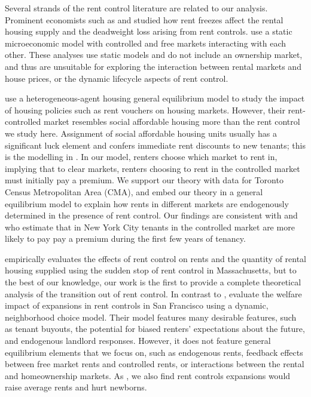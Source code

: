 \documentclass[parskip=full]{article}
\begin{document}
Several strands of the rent control literature are related to our analysis. Prominent economists such as \citet{hayek-1929} and \citet{fs-1946} studied how rent freezes affect the rental housing supply and the deadweight loss arising from rent controls. \citet{fallis-1985} use a static microeconomic model with controlled and free markets interacting with each other. These analyses use static models and do not include an ownership market, and thus are unsuitable for exploring the interaction between rental markets and house prices, or the dynamic lifecycle aspects of rent control.

\citet{fmn-2022} use a heterogeneous-agent housing general equilibrium model to study the impact of housing policies such as rent vouchers on housing markets. However, their rent-controlled market resembles social affordable housing more than the rent control we study here. Assignment of social affordable housing units usually has a significant luck element and confers immediate rent discounts to new tenants; this is the modelling in \citet{fmn-2022}. In our model, renters choose which market to rent in, implying that to clear markets, renters choosing to rent in the controlled market must initially pay a premium. We support our theory with data for Toronto Census Metropolitan Area (CMA), and embed our theory in a general equilibrium model to explain how rents in different markets are endogenously determined in the presence of rent control. Our findings are consistent with \citet{early-2000} and \citet{cjq-2023} who estimate that in New York City tenants in the controlled market are more likely to pay pay a premium during the first few years of tenancy.

\citet{sims-2007} empirically evaluates the effects of rent control on rents and the quantity of rental housing supplied using the sudden stop of rent control in Massachusetts, but to the best of our knowledge, our work is the first to provide a complete theoretical analysis of the transition out of rent control. In contrast to \citet{sims-2007}, \citet{diamond-2019} evaluate the welfare impact of expansions in rent controls in San Francisco using a dynamic, neighborhood choice model. Their model features many desirable features, such as tenant buyouts, the potential for biased renters' expectations about the future, and endogenous landlord responses. However, it does not feature general equilibrium elements that we focus on, such as endogenous rents, feedback effects between free market rents and controlled rents, or interactions between the rental and homeownership markets. As \citet{diamond-2019}, we also find rent controls expansions would raise average rents and hurt newborns.
\end{document}
